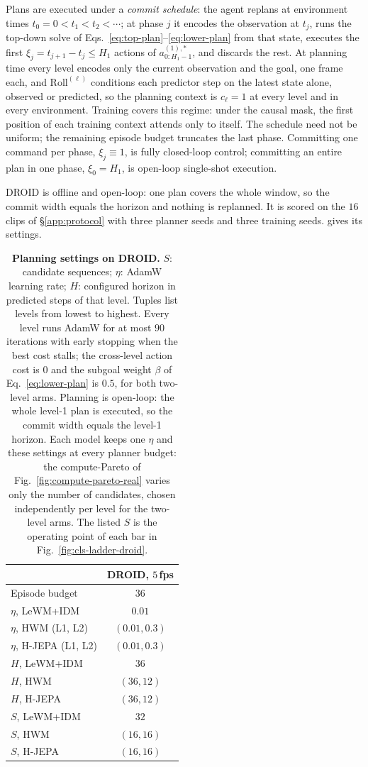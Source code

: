 Plans are executed under a \emph{commit schedule}: the agent replans
at environment times $t_0 = 0 < t_1 < t_2 < \cdots$; at phase $j$ it encodes the
observation at $t_j$, runs the top-down solve of
Eqs.~\eqref{eq:top-plan}--\eqref{eq:lower-plan} from that state, executes the first
$\xi_j = t_{j+1} - t_j \le H_1$ actions of $a^{(1),*}_{0:H_1-1}$, and discards the rest.
At planning time every level encodes only the current observation and the goal, one frame each,
and $\mathrm{Roll}^{(\ell)}$ conditions each predictor step on the latest state alone, observed or
predicted, so the planning context is $c_\ell=1$ at every level and in every environment. Training
covers this regime: under the causal mask, the first position of each training context attends
only to itself.
The schedule need not be uniform; the remaining episode budget truncates the last phase.
Committing one command per phase, $\xi_j \equiv 1$, is fully closed-loop control;
committing an entire plan in one phase, $\xi_0 = H_1$, is open-loop single-shot execution.

DROID is offline and open-loop: one plan covers the whole window, so the commit width equals
the horizon and nothing is replanned. It is scored on the $16$ clips of
\S\ref{app:protocol} with three planner seeds and three training seeds.
 gives its settings.

\begin{table}[ht]
\centering
\small
\setlength{\tabcolsep}{3.5pt}
\caption{\textbf{Planning settings on DROID.}
$S$: candidate sequences; $\eta$: AdamW
learning rate; $H$: configured horizon in predicted steps of that level. Tuples list levels from lowest to highest. Every level runs
AdamW for at most $90$ iterations with early stopping when the best cost stalls; the
cross-level action cost is $0$ and the subgoal weight $\beta$ of
Eq.~\eqref{eq:lower-plan} is $0.5$, for both two-level arms. Planning is open-loop: the whole level-1 plan is executed, so the commit
width equals the level-1 horizon. Each model keeps one $\eta$ and these settings at every
planner budget: the compute-Pareto of Fig.~\ref{fig:compute-pareto-real} varies only the number
of candidates, chosen independently per level for the two-level arms. The listed $S$ is the
operating point of each bar in Fig.~\ref{fig:cls-ladder-droid}.}
\label{tab:impl-planning-real}
\begin{tabular}{lc}
\toprule
 & DROID, $5$\,fps \\
\midrule
Episode budget & $36$ \\
$\eta$, LeWM+IDM & $0.01$ \\
$\eta$, HWM (L1, L2) & $(0.01, 0.3)$ \\
$\eta$, H-JEPA (L1, L2) & $(0.01, 0.3)$ \\
\midrule
$H$, LeWM+IDM & $36$ \\
$H$, HWM & $(36, 12)$ \\
$H$, H-JEPA & $(36, 12)$ \\
\midrule
$S$, LeWM+IDM & $32$ \\
$S$, HWM & $(16, 16)$ \\
$S$, H-JEPA & $(16, 16)$ \\
\bottomrule
\end{tabular}
\end{table}

